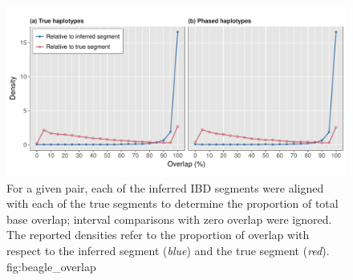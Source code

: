

\begin{figure}[!htb]
\includegraphics[width=\textwidth]{./img/ch3/beagle_overlap}
{For a given pair, each of the inferred IBD segments were aligned with each of the true segments to determine the proportion of total base overlap; interval comparisons with zero overlap were ignored.
The reported densities refer to the proportion of overlap with respect to the inferred segment (\emph{blue}) and the true segment (\emph{red}).
\AdditionLabel}
{fig:beagle_overlap}
\end{figure}
